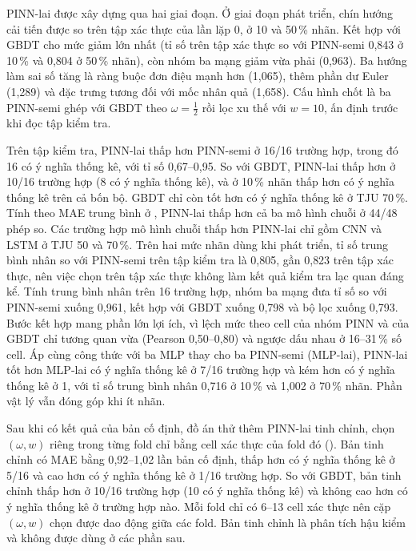 PINN-lai được xây dựng qua hai giai đoạn. Ở giai đoạn phát triển, chín hướng cải tiến được so trên tập xác thực của lần lặp 0, ở 10 và 50\,\% nhãn. Kết hợp với GBDT cho mức giảm lớn nhất (tỉ số trên tập xác thực so với PINN-semi 0{,}843 ở 10\,\% và 0{,}804 ở 50\,\% nhãn), còn nhóm ba mạng giảm vừa phải (0{,}963). Ba hướng làm sai số tăng là ràng buộc đơn điệu mạnh hơn (1{,}065), thêm phần dư Euler (1{,}289) và đặc trưng tương đối với mốc nhân quả (1{,}658). Cấu hình chốt là ba PINN-semi ghép với GBDT theo $\omega = \tfrac12$ rồi lọc xu thế với $w = 10$, ấn định trước khi đọc tập kiểm tra.

Trên tập kiểm tra, PINN-lai thấp hơn PINN-semi ở 16/16 trường hợp, trong đó 16 có ý nghĩa thống kê, với tỉ số 0{,}67--0{,}95. So với GBDT, PINN-lai thấp hơn ở 10/16 trường hợp (8 có ý nghĩa thống kê), và ở 10\,\% nhãn thấp hơn có ý nghĩa thống kê trên cả bốn bộ. GBDT chỉ còn tốt hơn có ý nghĩa thống kê ở TJU 70\,\%. Tính theo MAE trung bình ở , PINN-lai thấp hơn cả ba mô hình chuỗi ở 44/48 phép so. Các trường hợp mô hình chuỗi thấp hơn PINN-lai chỉ gồm CNN và LSTM ở TJU 50 và 70\,\%. Trên hai mức nhãn dùng khi phát triển, tỉ số trung bình nhân so với PINN-semi trên tập kiểm tra là 0{,}805, gần 0{,}823 trên tập xác thực, nên việc chọn trên tập xác thực không làm kết quả kiểm tra lạc quan đáng kể. Tính trung bình nhân trên 16 trường hợp, nhóm ba mạng đưa tỉ số so với PINN-semi xuống 0{,}961, kết hợp với GBDT xuống 0{,}798 và bộ lọc xuống 0{,}793. Bước kết hợp mang phần lớn lợi ích, vì lệch mức theo cell của nhóm PINN và của GBDT chỉ tương quan vừa (Pearson 0{,}50--0{,}80) và ngược dấu nhau ở 16--31\,\% số cell. Áp cùng công thức với ba MLP thay cho ba PINN-semi (MLP-lai), PINN-lai tốt hơn MLP-lai có ý nghĩa thống kê ở 7/16 trường hợp và kém hơn có ý nghĩa thống kê ở 1, với tỉ số trung bình nhân 0{,}716 ở 10\,\% và 1{,}002 ở 70\,\% nhãn. Phần vật lý vẫn đóng góp khi ít nhãn.

Sau khi có kết quả của bản cố định, đồ án thử thêm PINN-lai tinh chỉnh, chọn $(\omega, w)$ riêng trong từng fold chỉ bằng cell xác thực của fold đó (). Bản tinh chỉnh có MAE bằng 0{,}92--1{,}02 lần bản cố định, thấp hơn có ý nghĩa thống kê ở 5/16 và cao hơn có ý nghĩa thống kê ở 1/16 trường hợp. So với GBDT, bản tinh chỉnh thấp hơn ở 10/16 trường hợp (10 có ý nghĩa thống kê) và không cao hơn có ý nghĩa thống kê ở trường hợp nào. Mỗi fold chỉ có 6--13 cell xác thực nên cặp $(\omega, w)$ chọn được dao động giữa các fold. Bản tinh chỉnh là phân tích hậu kiểm và không được dùng ở các phần sau.
